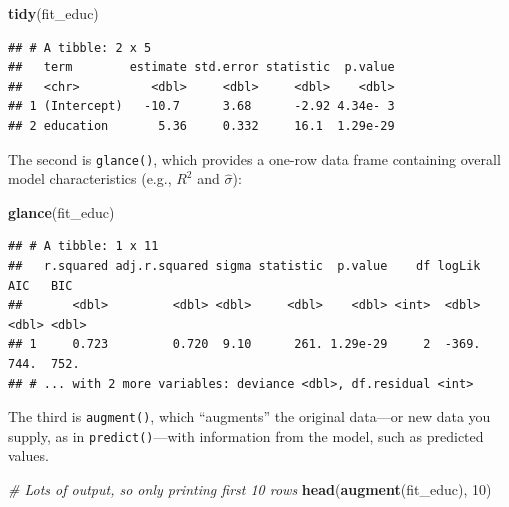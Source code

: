 \documentclass[
  12pt,
  oneside,openany]{book}
\newenvironment{Shaded}{\begin{snugshade}}{\end{snugshade}}
\newcommand{\CommentTok}[1]{\textcolor[rgb]{0.56,0.35,0.01}{\textit{#1}}}
\newcommand{\DecValTok}[1]{\textcolor[rgb]{0.00,0.00,0.81}{#1}}
\newcommand{\KeywordTok}[1]{\textcolor[rgb]{0.13,0.29,0.53}{\textbf{#1}}}
\newcommand{\NormalTok}[1]{#1}
\begin{document}
\begin{Shaded}
\begin{Highlighting}[]
\KeywordTok{tidy}\NormalTok{(fit\_educ)}
\end{Highlighting}
\end{Shaded}

\begin{verbatim}
## # A tibble: 2 x 5
##   term        estimate std.error statistic  p.value
##   <chr>          <dbl>     <dbl>     <dbl>    <dbl>
## 1 (Intercept)   -10.7      3.68      -2.92 4.34e- 3
## 2 education       5.36     0.332     16.1  1.29e-29
\end{verbatim}

The second is \texttt{glance()}, which provides a one-row data frame containing overall model characteristics (e.g., \(R^2\) and \(\hat{\sigma}\)):

\begin{Shaded}
\begin{Highlighting}[]
\KeywordTok{glance}\NormalTok{(fit\_educ)}
\end{Highlighting}
\end{Shaded}

\begin{verbatim}
## # A tibble: 1 x 11
##   r.squared adj.r.squared sigma statistic  p.value    df logLik   AIC   BIC
##       <dbl>         <dbl> <dbl>     <dbl>    <dbl> <int>  <dbl> <dbl> <dbl>
## 1     0.723         0.720  9.10      261. 1.29e-29     2  -369.  744.  752.
## # ... with 2 more variables: deviance <dbl>, df.residual <int>
\end{verbatim}

The third is \texttt{augment()}, which ``augments'' the original data---or new data you supply, as in \texttt{predict()}---with information from the model, such as predicted values.

\begin{Shaded}
\begin{Highlighting}[]
\CommentTok{\# Lots of output, so only printing first 10 rows}
\KeywordTok{head}\NormalTok{(}\KeywordTok{augment}\NormalTok{(fit\_educ), }\DecValTok{10}\NormalTok{)}
\end{Highlighting}
\end{Shaded}
\end{document}

